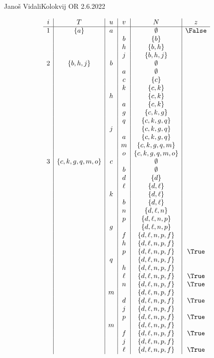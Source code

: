 \begin{naloga}{Janoš Vidali}{Kolokvij OR 2.6.2022}
\begin{odgovor}
\begin{tabela}
$$
\begin{array}{c|c|c|c|c|c}
i & T & u & v & N & z \\ \hline
1 & \{a\} & a && \emptyset & \False \\
&&& b & \{b\} \\
&&& h & \{b, h\} \\
&&& j & \{b, h, j\} \\
2 & \{b, h, j\} & b && \emptyset \\
&&& a & \emptyset \\
&&& c & \{c\} \\
&&& k & \{c, k\} \\
&& h && \{c, k\} \\
&&& a & \{c, k\} \\
&&& g & \{c, k, g\} \\
&&& q & \{c, k, g, q\} \\
&& j && \{c, k, g, q\} \\
&&& a & \{c, k, g, q\} \\
&&& m & \{c, k, g, q, m\} \\
&&& o & \{c, k, g, q, m, o\} \\
3 & \{c, k, g, q, m, o\} & c && \emptyset \\
&&& b & \emptyset \\
&&& d & \{d\} \\
&&& \ell & \{d, \ell\} \\
&& k && \{d, \ell\} \\
&&& b & \{d, \ell\} \\
&&& n & \{d, \ell, n\} \\
&&& p & \{d, \ell, n, p\} \\
&& g && \{d, \ell, n, p\} \\
&&& f & \{d, \ell, n, p, f\} \\
&&& h & \{d, \ell, n, p, f\} \\
&&& p & \{d, \ell, n, p, f\} & \True \\
&& q && \{d, \ell, n, p, f\} \\
&&& h & \{d, \ell, n, p, f\} \\
&&& \ell & \{d, \ell, n, p, f\} & \True \\
&&& n & \{d, \ell, n, p, f\} & \True \\
&& m && \{d, \ell, n, p, f\} \\
&&& d & \{d, \ell, n, p, f\} & \True \\
&&& j & \{d, \ell, n, p, f\} \\
&&& p & \{d, \ell, n, p, f\} & \True \\
&& m && \{d, \ell, n, p, f\} \\
&&& f & \{d, \ell, n, p, f\} & \True \\
&&& j & \{d, \ell, n, p, f\} \\
&&& \ell & \{d, \ell, n, p, f\} & \True
\end{array}
$$
\end{tabela}
\end{odgovor}
\end{naloga}
